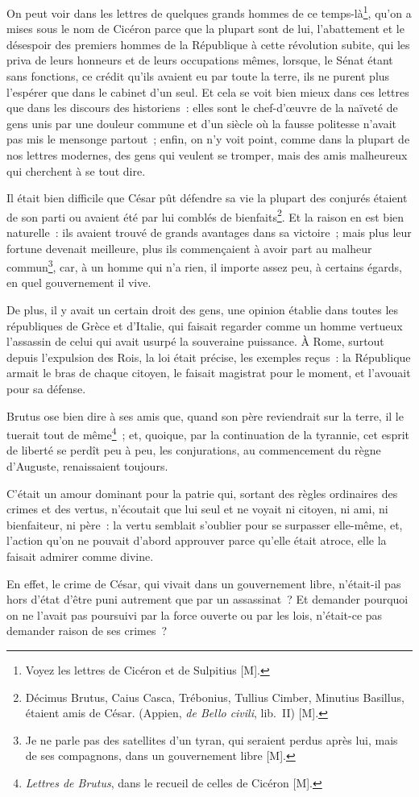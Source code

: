 \documentclass[french,twoside]{book} %
\newcommand\chapterclose{} %
\begin{document}
On peut voir dans les lettres de quelques grands hommes de ce temps-là\footnote{Voyez les lettres de Cicéron et de Sulpitius [M].}, qu’on a mises sous le nom de Cicéron parce que la plupart sont de lui, l’abattement et le désespoir des premiers hommes de la République à cette révolution subite, qui les priva de leurs honneurs et de leurs occupations mêmes, lorsque, le Sénat étant sans fonctions, ce crédit qu’ils avaient eu par toute la terre, ils ne purent plus l’espérer que dans le cabinet d’un seul. Et cela se voit bien mieux dans ces lettres que dans les discours des historiens : elles sont le chef-d’œuvre de la naïveté de gens unis par une douleur commune et d’un siècle où la fausse politesse n’avait pas mis le mensonge partout ; enfin, on n’y voit point, comme dans la plupart de nos lettres modernes, des gens qui veulent se tromper, mais des amis malheureux qui cherchent à se tout dire.\par
Il était bien difficile que César pût défendre sa vie la plupart des conjurés étaient de son parti ou avaient été par lui comblés de bienfaits\footnote{Décimus Brutus, Caius Casca, Trébonius, Tullius Cimber, Minutius Basillus, étaient amis de César. (Appien, {\itshape de Bello civili}, lib. II) [M].}. Et la raison en est bien naturelle : ils avaient trouvé de grands avantages dans sa victoire ; mais plus leur fortune devenait meilleure, plus ils commençaient à avoir part au malheur commun\footnote{Je ne parle pas des satellites d’un tyran, qui seraient perdus après lui, mais de ses compagnons, dans un gouvernement libre [M].}, car, à un homme qui n’a rien, il importe assez peu, à certains égards, en quel gouvernement il vive.\par
De plus, il y avait un certain droit des gens, une opinion établie dans toutes les républiques de Grèce et d’Italie, qui faisait regarder comme un homme vertueux l’assassin de celui qui avait usurpé la souveraine puissance. À Rome, surtout depuis l’expulsion des Rois, la loi était précise, les exemples reçus : la République armait le bras de chaque citoyen, le faisait magistrat pour le moment, et l’avouait pour sa défense.\par
Brutus ose bien dire à ses amis que, quand son père reviendrait sur la terre, il le tuerait tout de même\footnote{{\itshape Lettres de Brutus}, dans le recueil de celles de Cicéron [M].} ; et, quoique, par la continuation de la tyrannie, cet esprit de liberté se perdît peu à peu, les conjurations, au commencement du règne d’Auguste, renaissaient toujours.\par
C’était un amour dominant pour la patrie qui, sortant des règles ordinaires des crimes et des vertus, n’écoutait que lui seul et ne voyait ni citoyen, ni ami, ni bienfaiteur, ni père : la vertu semblait s’oublier pour se surpasser elle-même, et, l’action qu’on ne pouvait d’abord approuver parce qu’elle était atroce, elle la faisait admirer comme divine.\par
En effet, le crime de César, qui vivait dans un gouvernement libre, n’était-il pas hors d’état d’être puni autrement que par un assassinat ? Et demander pourquoi on ne l’avait pas poursuivi par la force ouverte ou par les lois, n’était-ce pas demander raison de ses crimes ?
\chapterclose
\end{document}
